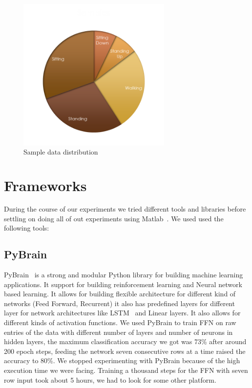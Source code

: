 \documentclass{article}
\begin{document}
\begin{figure}
\centering
\includegraphics[width=3.0in]{samples_piechart}
\caption{Sample data distribution}
\label{sample_dist}
\end{figure}

\section{Frameworks}
\label{tools}

During the course of our experiments we tried different tools and libraries before settling on doing all of out experiments using 
Matlab~\cite{MATLAB:2014}. We used used the following tools:

\subsection{PyBrain}
PyBrain~\cite{pybrain2010jmlr} is a strong and modular Python library for building machine learning applications. It
support for building reinforcement learning and Neural network based learning. It allows for building flexible architecture for different
kind of networks (Feed Forward, Recurrent) it also has predefined layers for different layer for  network architectures like 
LSTM~\cite{hochreiter1997long} and Linear layers. It also allows for different kinds of activation functions. We used PyBrain to train FFN 
on raw entries of the data with  different number of layers and number of neurons in hidden layers, the maximum classification 
accuracy we got was 73\% after around 200 epoch steps, feeding the network seven consecutive rows at a time  raised the accuracy to 80\%.
We stopped experimenting with PyBrain because of the high execution time we were facing. Training a thousand steps for the FFN with 
seven row input took about 5 hours, we had to look for some other platform. 
\end{document}

